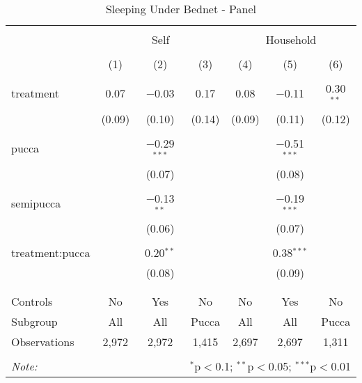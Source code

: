 
\begin{table}[!htbp] \centering 
  \caption{Sleeping Under Bednet - Panel} 
  \label{tbl:Sleeping Under Bednet - Panel} 
\begin{tabular}{@{\extracolsep{5pt}}lcccccc} 
\\[-1.8ex]\hline 
\hline \\[-1.8ex] 
 & \multicolumn{3}{c}{Self} & \multicolumn{3}{c}{Household} \\ 
\\[-1.8ex] & (1) & (2) & (3) & (4) & (5) & (6)\\ 
\hline \\[-1.8ex] 
 treatment & 0.07 & $-$0.03 & 0.17 & 0.08 & $-$0.11 & 0.30$^{**}$ \\ 
  & (0.09) & (0.10) & (0.14) & (0.09) & (0.11) & (0.12) \\ 
  & & & & & & \\ 
 pucca &  & $-$0.29$^{***}$ &  &  & $-$0.51$^{***}$ &  \\ 
  &  & (0.07) &  &  & (0.08) &  \\ 
  & & & & & & \\ 
 semipucca &  & $-$0.13$^{**}$ &  &  & $-$0.19$^{***}$ &  \\ 
  &  & (0.06) &  &  & (0.07) &  \\ 
  & & & & & & \\ 
 treatment:pucca &  & 0.20$^{**}$ &  &  & 0.38$^{***}$ &  \\ 
  &  & (0.08) &  &  & (0.09) &  \\ 
  & & & & & & \\ 
\hline \\[-1.8ex] 
Controls & No & Yes & No & No & Yes & No \\ 
Subgroup & All & All & Pucca & All & All & Pucca \\ 
Observations & 2,972 & 2,972 & 1,415 & 2,697 & 2,697 & 1,311 \\ 
\hline 
\hline \\[-1.8ex] 
\textit{Note:}  & \multicolumn{6}{r}{$^{*}$p$<$0.1; $^{**}$p$<$0.05; $^{***}$p$<$0.01} \\ 
\end{tabular} 
\end{table} 
